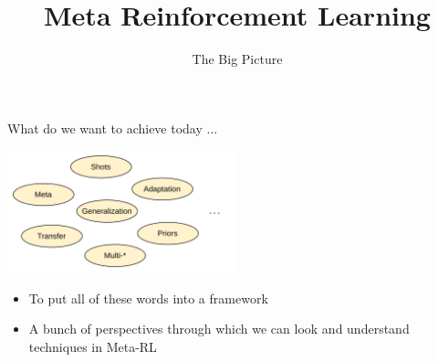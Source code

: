 \documentclass[aspectratio=169]{../latex_main/tntbeamer}  %
\title[Meta-RL]{Meta Reinforcement Learning}
\subtitle{The Big Picture}
\begin{document}
	
	\maketitle

\begin{frame}{What do we want to achieve today ...}

    \centering
    \includegraphics[width=0.5\textwidth]{images/t01/Buzz.png}

    \begin{itemize}
        \item To put all of these words into a framework
        \item A bunch of perspectives through which we can look and understand techniques in Meta-RL
    \end{itemize}

\end{frame}
\end{document}
